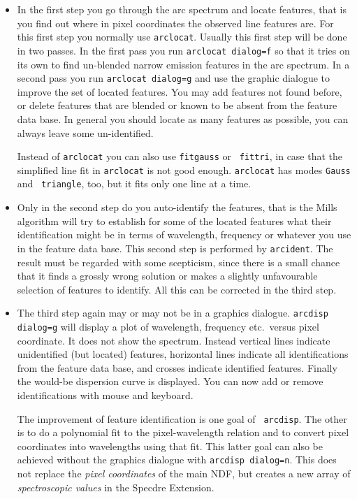 \begin{itemize}
\item In the first step you go through the arc spectrum and locate
   features, that is you find out where in pixel coordinates the
   observed line features are.  For this first step you normally use
   {\tt arclocat}.  Usually this first step will be done in two passes.
   In the first pass you run {\tt arclocat dialog=f} so that it tries on
   its own to find un-blended narrow emission features in the arc
   spectrum.  In a second pass you run {\tt arclocat dialog=g} and use
   the graphic dialogue to improve the set of located features.  You may
   add features not found before, or delete features that are blended
   or known to be absent from the feature data base.  In general
   you should locate as many features as possible, you can always leave
   some un-identified.

   Instead of {\tt arclocat} you can also use {\tt fitgauss} or {\tt
   fittri}, in case that the simplified line fit in {\tt arclocat} is
   not good enough.  {\tt arclocat} has modes {\tt Gauss} and {\tt
   triangle}, too, but it fits only one line at a time.

\item Only in the second step do you auto-identify the features, that is
   the Mills algorithm will try to establish for some of the located
   features what their identification might be in terms of wavelength,
   frequency or whatever you use in the feature data base.  This second
   step is performed by {\tt arcident}.  The result must be regarded
   with some scepticism, since there is a small chance that it finds a
   grossly wrong solution or makes a slightly unfavourable selection of
   features to identify.  All this can be corrected in the third step.

\item The third step again may or may not be in a graphics dialogue.
   {\tt arcdisp dialog=g} will display a plot of wavelength, frequency
   etc.\ versus pixel coordinate.  It does not show the spectrum.
   Instead vertical lines indicate unidentified (but located) features,
   horizontal lines indicate all identifications from the feature data
   base, and crosses indicate identified features.
   Finally the would-be dispersion curve is displayed.  You can
   now add or remove identifications with mouse and keyboard.

   The improvement of feature identification is one goal of {\tt
   arcdisp}.  The other is to do a polynomial fit to the
   pixel-wavelength relation and to convert pixel coordinates into
   wavelengths using that fit.  This latter goal can also be achieved
   without the graphics dialogue with {\tt arcdisp dialog=n}.  This does
   not replace the {\it pixel coordinates} of the main NDF, but creates
   a new array of {\it spectroscopic values} in the Specdre Extension.

\end{itemize}


